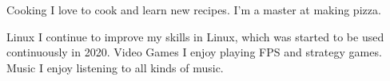 



\begin{cvskills}
  \cvskill
    {Cooking} %
    {I love to cook and learn new recipes. I'm a master at making pizza.} %

  \cvskill
    {Linux} %
    {I continue to improve my skills in Linux, which was started to be used continuously in 2020. } %
  \cvskill
    {Video Games} %
    {I enjoy playing FPS and strategy games.} %
  \cvskill
    {Music} %
    {I enjoy listening to all kinds of music. } %

\end{cvskills}